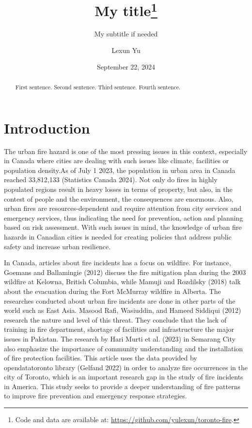 \documentclass[
  letterpaper,
  DIV=11,
  numbers=noendperiod]{scrartcl}
\title{My title\thanks{Code and data are available at:
\url{https://github.com/yulexun/toronto-fire}.}}
\subtitle{My subtitle if needed}
\author{Lexun Yu}
\date{September 22, 2024}
\renewcommand*\contentsname{Table of contents}
\newcommand\contentsname{Table of contents}
\begin{document}
\maketitle
\begin{abstract}
First sentence. Second sentence. Third sentence. Fourth sentence.
\end{abstract}

\renewcommand*\contentsname{Table of contents}
{
\hypersetup{linkcolor=}
\setcounter{tocdepth}{3}
\tableofcontents
}

\section{Introduction}\label{sec-intro}

The urban fire hazard is one of the most pressing issues in this
context, especially in Canada where cities are dealing with such issues
like climate, facilities or population density.As of July 1 2023, the
population in urban area in Canada reached 33,812,133 (Statistics Canada
2024). Not only do fires in highly populated regions result in heavy
losses in terms of property, but also, in the contest of people and the
environment, the consequences are enormous. Also, urban fires are
resources-dependent and require attention from city services and
emergency services, thus indicating the need for prevention, action and
planning based on risk assessment. With such issues in mind, the
knowledge of urban fire hazards in Canadian cities is needed for
creating policies that address public safety and increase urban
resilience.

In Canada, articles about fire incidents has a focus on wildfire. For
instance, Goemans and Ballamingie (2012) discuss the fire mitigation
plan during the 2003 wildfire at Kelowna, British Columbia, while Mamuji
and Rozdilsky (2018) talk about the evacuation during the Fort McMurray
wildfire in Alberta. The researches conducted about urban fire incidents
are done in other parts of the world such as East Asia. Masood Rafi,
Wasiuddin, and Hameed Siddiqui (2012) research the nature and level of
this threat. They conclude that the lack of training in fire department,
shortage of facilities and infrastructure the major issues in Pakistan.
The research by Hari Murti et al. (2023) in Semarang City also emphasize
the importance of community understanding and the installation of fire
protection facilities. This article uses the data provided by
opendatatoronto library (Gelfand 2022) in order to analyze fire
occurrences in the city of Toronto, which is an important research gap
in the study of fire incidents in America. This study seeks to provide a
deeper understanding of fire patterns to improve fire prevention and
emergency response strategies.
\end{document}
